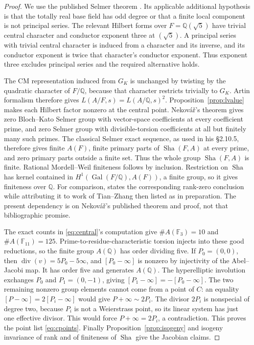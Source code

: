\documentclass[11pt]{article}
\newcommand{\Q}{\mathbb Q}
\newcommand{\F}{\mathbb F}
\numberwithin{equation}{section}
\newcommand{\Sha}{\operatorname{Sha}}
\newcommand{\Gal}{\operatorname{Gal}}
\theoremstyle{definition}
\begin{document}
\begin{proof}
We use the published Selmer theorem
\citet[Theorem B, p.~593; proof \S2.10.5, p.~641]{Nekovar2012}.
Its applicable additional hypothesis is
that the totally real base field has odd degree or that a finite local
component is not principal series. The relevant Hilbert forms over
$F=\Q(\sqrt5)$ have trivial central character and conductor exponent
three at $(\sqrt5)$. A principal series with trivial central character
is induced from a character and its inverse, and its conductor
exponent is twice that character's conductor exponent. Thus exponent
three excludes principal series and the required alternative holds.

The CM representation induced from $G_K$ is unchanged by twisting by
the quadratic character of $F/\Q$, because that character restricts
trivially to $G_K$. Artin formalism therefore gives
$L(A/F,s)=L(A/\Q,s)^2$. Proposition~\ref{prop:lvalue} makes each Hilbert
factor nonzero at the central point. Nekov\'a\v r's theorem gives zero
Bloch--Kato Selmer group with vector-space coefficients at every
coefficient prime, and zero Selmer group with divisible-torsion
coefficients at all but finitely many such primes. The classical
Selmer exact sequence, as used in his \S2.10.5, therefore gives finite
$A(F)$, finite primary parts of $\Sha(F,A)$ at every prime, and zero
primary parts outside a finite set. Thus the whole group $\Sha(F,A)$
is finite. Rational Mordell--Weil finiteness follows
by inclusion. Restriction on $\Sha$ has kernel contained in
$H^1(\Gal(F/\Q),A(F))$, a finite group, so it gives finiteness over $\Q$.
For comparison, \citet[Theorem 4.3.2, p.~588]{Zhang2010} states the
corresponding rank-zero conclusion while attributing it to work of
Tian--Zhang then listed as in preparation. The present dependency is
on Nekov\'a\v r's published theorem and proof, not that bibliographic
promise.

The exact counts in \eqref{eq:central}'s computation give
$\#A(\F_3)=10$ and $\#A(\F_{11})=125$. Prime-to-residue-characteristic
torsion injects into these good reductions, so the finite group
$A(\Q)$ has order dividing five. If $P_0=(0,0)$, then
$\operatorname{div}(v)=5P_0-5\infty$, and
$[P_0-\infty]$ is nonzero by injectivity of the Abel--Jacobi map.
It has order five and generates $A(\Q)$.
The hyperelliptic involution exchanges $P_0$ and $P_1=(0,-1)$, giving
$[P_1-\infty]=-[P_0-\infty]$. The two remaining nonzero group elements
cannot come from a point of $C$: an equality
$[P-\infty]=2[P_i-\infty]$ would give $P+\infty\sim2P_i$.
The divisor $2P_i$ is nonspecial of degree two, because $P_i$ is not
a Weierstrass point, so its linear system has just one effective
divisor. This would force $P+\infty=2P_i$, a contradiction.
This proves the point list \eqref{eq:cpoints}.
Finally Proposition~\ref{prop:isogeny} and isogeny invariance of rank
and of finiteness of $\Sha$ give the Jacobian claims.
\end{proof}
\end{document}
